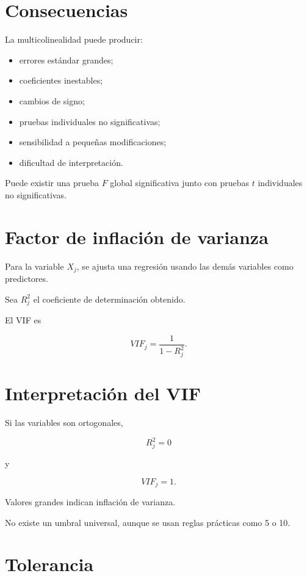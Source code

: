 \documentclass[
  spanish,
  11pt,
  letterpaper,
  DIV=11,
  numbers=noendperiod]{scrreprt}
\providecommand{\tightlist}{%
  \setlength{\itemsep}{0pt}\setlength{\parskip}{0pt}}
\theoremstyle{definition}
\theoremstyle{plain}
\theoremstyle{definition}
\theoremstyle{remark}
\begin{document}
\section{Consecuencias}\label{consecuencias}

La multicolinealidad puede producir:

\begin{itemize}
\tightlist
\item
  errores estándar grandes;
\item
  coeficientes inestables;
\item
  cambios de signo;
\item
  pruebas individuales no significativas;
\item
  sensibilidad a pequeñas modificaciones;
\item
  dificultad de interpretación.
\end{itemize}

Puede existir una prueba \(F\) global significativa junto con pruebas
\(t\) individuales no significativas.

\section{Factor de inflación de
varianza}\label{factor-de-inflaciuxf3n-de-varianza}

Para la variable \(X_j\), se ajusta una regresión usando las demás
variables como predictores.

Sea \(R_j^2\) el coeficiente de determinación obtenido.

El VIF es

\[
VIF_j
=
\frac{
1
}{
1-R_j^2
}.
\]

\section{Interpretación del VIF}\label{interpretaciuxf3n-del-vif}

Si las variables son ortogonales,

\[
R_j^2=0
\]

y

\[
VIF_j=1.
\]

Valores grandes indican inflación de varianza.

No existe un umbral universal, aunque se usan reglas prácticas como 5 o
10.

\section{Tolerancia}\label{tolerancia}
\end{document}
